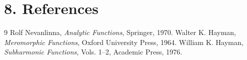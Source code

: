\section*{8. References}

\begin{thebibliography}{9}
 Rolf Nevanlinna, \emph{Analytic Functions}, Springer, 1970.
 Walter K. Hayman, \emph{Meromorphic Functions}, Oxford University Press, 1964.
 William K. Hayman, \emph{Subharmonic Functions}, Vols. 1--2, Academic Press, 1976.
\end{thebibliography}